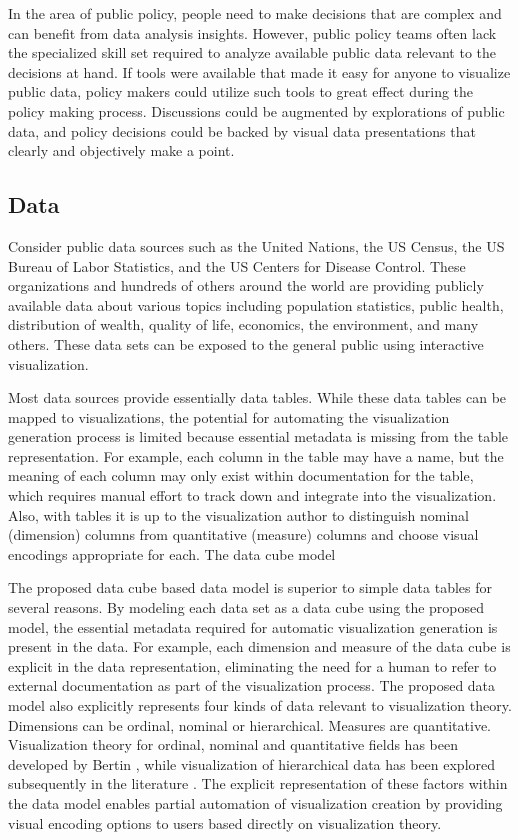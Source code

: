 \documentclass[12pt]{article}
\begin{document}
\begin{doublespace}
In the area of public policy, people need to make decisions that are complex and can benefit from data analysis insights. However, public policy teams often lack the specialized skill set required to analyze available public data relevant to the decisions at hand. If tools were available that made it easy for anyone to visualize public data, policy makers could utilize such tools to great effect during the policy making process. Discussions could be augmented by explorations of public data, and policy decisions could be backed by visual data presentations that clearly and objectively make a point.

\subsection{Data}
Consider public data sources such as the United Nations, the US Census, the US Bureau of Labor Statistics, and the US Centers for Disease Control. These organizations and hundreds of others around the world are providing publicly available data about various topics including population statistics, public health, distribution of wealth, quality of life, economics, the environment, and many others. These data sets can be exposed to the general public using interactive visualization.

Most data sources provide essentially data tables. While these data tables can be mapped to visualizations, the potential for automating the visualization generation process is limited because essential metadata is missing from the table representation. For example, each column in the table may have a name, but the meaning of each column may only exist within documentation for the table, which requires manual effort to track down and integrate into the visualization. Also, with tables it is up to the visualization author to distinguish nominal (dimension) columns from quantitative (measure) columns and choose visual encodings appropriate for each. The data cube model 

The proposed data cube based data model is superior to simple data tables for several reasons. By modeling each data set as a data cube using the proposed model, the essential metadata required for automatic visualization generation is present in the data. For example, each dimension and measure of the data cube is explicit in the data representation, eliminating the need for a human to refer to external documentation as part of the visualization process. The proposed data model also explicitly represents four kinds of data relevant to visualization theory. Dimensions can be ordinal, nominal or hierarchical. Measures are quantitative. Visualization theory for ordinal, nominal and quantitative fields has been developed by Bertin \cite{bertin1983semiology}, while visualization of hierarchical data has been explored subsequently in the literature \cite{barlow2001comparison}. The explicit representation of these factors within the data model enables partial automation of visualization creation by providing visual encoding options to users based directly on visualization theory.


\end{doublespace}
\end{document}
